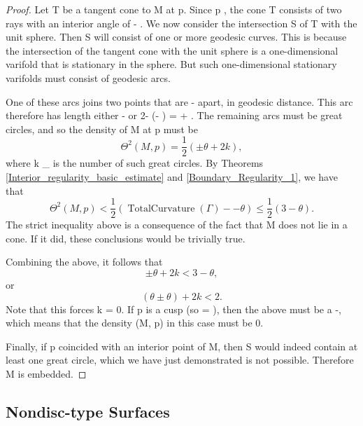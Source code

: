\documentclass[a4paper, 11pt]{article}
\theoremstyle{plain}
\theoremstyle{definition}
\theoremstyle{remark}
\numberwithin{equation}{subsection}
\def\({}
\def\){}
\def\pi{}
\begin{document}
\begin{proof}
Let \(T\) be a tangent cone to \(M\) at \(p\). Since \(p \in \Gamma\), the cone \(T\) consists of two rays with an interior angle of \(\pi - \theta\). We now consider the intersection \(S\) of \(T\) with the unit sphere. Then \(S\) will consist of one or more geodesic curves. This is because the intersection of the tangent cone with the unit sphere is a one-dimensional varifold that is stationary in the sphere. But such one-dimensional stationary varifolds must consist of geodesic arcs.

One of these arcs joins two points that are \(\pi - \theta\) apart, in geodesic distance. This arc therefore has length either \(\pi - \theta\) or \(2\pi - (\pi - \theta) = \pi + \theta\). The remaining arcs must be great circles, and so the density of \(M\) at \(p\) must be
\begin{equation}
\Theta^{2}(M, p) = \frac{1}{2\pi}(\pi \pm \theta + 2k\pi),
\end{equation} 
where \(k \in {}_{}\) is the number of such great circles. By Theorems \ref{Interior_regularity_basic_estimate} and \ref{Boundary_Regularity_1}, we have that
\begin{equation}
\Theta^{2}(M, p) < \frac{1}{2\pi}(\operatorname{TotalCurvature}(\Gamma) - \pi - \theta) \leqslant \frac{1}{2\pi}(3\pi - \theta).
\end{equation}
The strict inequality above is a consequence of the fact that \(M\) does not lie in a cone. If it did, these conclusions would be trivially true.

Combining the above, it follows that
\begin{equation}
\pi \pm \theta + 2k\pi < 3\pi - \theta,
\end{equation}
or
\begin{equation}
(\theta \pm \theta) + 2k\pi < 2\pi.
\end{equation}
Note that this forces \(k = 0\). If \(p\) is a cusp (so \(\theta = \pi)\), then the \(\pm\) above must be a \(-\), which means that the density \(\Theta(M, p)\) in this case must be \(0\).

Finally, if \(p \in \Gamma\) coincided with an interior point of \(M\), then \(S\) would indeed contain at least one great circle, which we have just demonstrated is not possible. Therefore \(M\) is embedded.
\end{proof}

\subsection{Nondisc-type Surfaces}
\label{section: Nondisc-type Surfaces}
\end{document}
